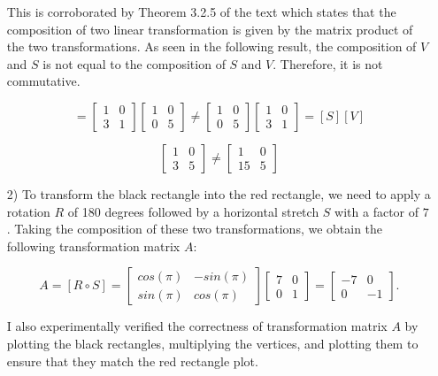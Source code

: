 \documentclass[10pt]{article}
\begin{document}
\begin{enumerate}[leftmargin=\labelsep]
    This is corroborated by Theorem 3.2.5 of the text which states that the composition of two linear transformation is given by the matrix product of the two transformations. As seen in the following result, the composition of $V$ and $S$ is not equal to the composition of $S$ and $V$. Therefore, it is not commutative.
    
    \begin{equation*}
    [V][S] = 
        \begin{bmatrix} 
            1 & 0 \\ 3 & 1 
        \end{bmatrix}
        \begin{bmatrix} 
            1 & 0 \\ 0 & 5 
        \end{bmatrix}
        \neq
        \begin{bmatrix}
            1 & 0 \\ 0 & 5 
        \end{bmatrix} 
        \begin{bmatrix} 
            1 & 0 \\ 
            3 & 1 
        \end{bmatrix}
    = [S][V]
    \end{equation*}
    
    \begin{equation*}
        \begin{bmatrix}
            1 & 0 \\
            3 & 5
        \end{bmatrix}
        \neq
        \begin{bmatrix}
            1 & 0 \\
            15 & 5
        \end{bmatrix}
    \end{equation*}

    \item[2)] To transform the black rectangle into the red rectangle, we need to apply a rotation $R$ of 180 degrees followed by a horizontal stretch $S$ with a factor of $7$. Taking the composition of these two transformations, we obtain the following transformation matrix $A$:

    \[ A = [R \circ S]
    = 
    \begin{bmatrix}
        cos(\pi) & -sin(\pi) \\
        sin(\pi) & cos(\pi)
    \end{bmatrix} 
    \begin{bmatrix}
        7 & 0 \\
        0 & 1
    \end{bmatrix} 
    = 
    \begin{bmatrix}
        -7 & 0 \\
        0 & -1
    \end{bmatrix}. \]
    
    I also experimentally verified the correctness of transformation matrix $A$ by plotting the black rectangles, multiplying the vertices, and plotting them to ensure that they match the red rectangle plot.
\end{enumerate}
\end{document}
